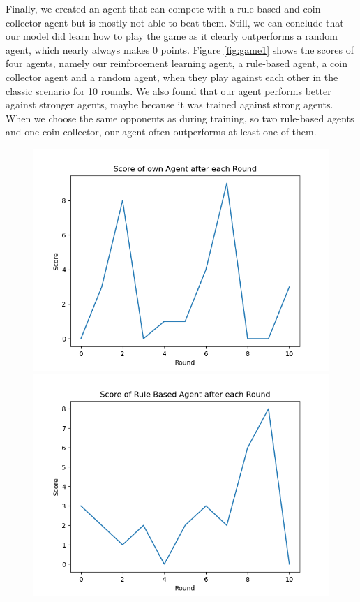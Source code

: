 Finally, we created an agent that can compete with a rule-based and coin collector agent but is mostly not able to beat them. Still, we can conclude that our model did learn how to play the game as it clearly outperforms a random agent, which nearly always makes 0 points. Figure \ref{fig:game1} shows the scores of four agents, namely our reinforcement learning agent, a rule-based agent, a coin collector agent and a random agent, when they play against each other in the classic scenario for 10 rounds. We also found that our agent performs better against stronger agents, maybe because it was trained against strong agents. When we choose the same opponents as during training, so two rule-based agents and one coin collector, our agent often outperforms at least one of them.
\begin{figure}[H]
	\centering
	\begin{minipage}{0.49\textwidth}
		\centering
		\includegraphics[scale=0.52]{images/my_scores11_1.png}
	\end{minipage}
	\begin{minipage}{0.49\textwidth}
		\centering
		\includegraphics[scale=0.52]{images/rule_scores11_1.png}

\end{minipage}
\end{figure}
